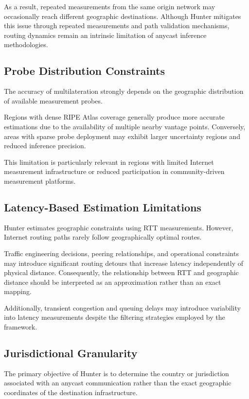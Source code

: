 As a result, repeated measurements from the same origin network may occasionally reach different geographic destinations. Although Hunter mitigates this issue through repeated measurements and path validation mechanisms, routing dynamics remain an intrinsic limitation of anycast inference methodologies.

\subsection{Probe Distribution Constraints}

The accuracy of multilateration strongly depends on the geographic distribution of available measurement probes.

Regions with dense RIPE Atlas coverage generally produce more accurate estimations due to the availability of multiple nearby vantage points. Conversely, areas with sparse probe deployment may exhibit larger uncertainty regions and reduced inference precision.

This limitation is particularly relevant in regions with limited Internet measurement infrastructure or reduced participation in community-driven measurement platforms.

\subsection{Latency-Based Estimation Limitations}

Hunter estimates geographic constraints using RTT measurements. However, Internet routing paths rarely follow geographically optimal routes.

Traffic engineering decisions, peering relationships, and operational constraints may introduce significant routing detours that increase latency independently of physical distance. Consequently, the relationship between RTT and geographic distance should be interpreted as an approximation rather than an exact mapping.

Additionally, transient congestion and queuing delays may introduce variability into latency measurements despite the filtering strategies employed by the framework.

\subsection{Jurisdictional Granularity}

The primary objective of Hunter is to determine the country or jurisdiction associated with an anycast communication rather than the exact geographic coordinates of the destination infrastructure.

